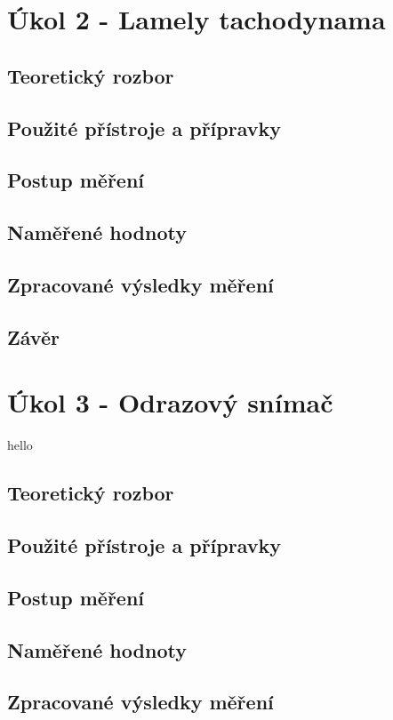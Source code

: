 \documentclass{protokol}
\begin{document}
\pagebreak

\section{Úkol 2 - Lamely tachodynama}
    \subsection{Teoretický rozbor}
    \subsection{Použité přístroje a přípravky}
    \subsection{Postup měření}
    \subsection{Naměřené hodnoty}
    \subsection{Zpracované výsledky měření}
    \subsection{Závěr}

\pagebreak

\section{Úkol 3 - Odrazový snímač}
    hello
    \subsection{Teoretický rozbor}
    \subsection{Použité přístroje a přípravky}
    \subsection{Postup měření}
    \subsection{Naměřené hodnoty}
    \subsection{Zpracované výsledky měření}
\end{document}

